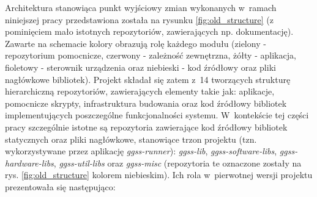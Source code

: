 Architektura stanowiąca punkt wyjściowy zmian wykonanych w~ramach niniejszej pracy przedstawiona została na rysunku \ref{fig:old_structure} (z pominięciem mało istotnych repozytoriów, zawierających np. dokumentację). Zawarte na schemacie kolory obrazują rolę każdego modułu (zielony - repozytorium pomocnicze, czerwony - zależność zewnętrzna, żółty - aplikacja, fioletowy - sterownik urządzenia oraz niebieski - kod źródłowy oraz pliki nagłówkowe bibliotek). Projekt składał się zatem z~14 tworzących strukturę hierarchiczną repozytoriów, zawierających elementy takie jak: aplikacje, pomocnicze skrypty, infrastruktura budowania oraz kod źródłowy bibliotek implementujących poszczególne funkcjonalności systemu. W~kontekście tej części pracy szczególnie istotne są repozytoria zawierające kod źródłowy bibliotek statycznych oraz pliki nagłówkowe, stanowiące trzon projektu (tzn. wykorzystywane przez aplikację \emph{ggss-runner}): \emph{ggss-lib}, \emph{ggss-software-libs}, \emph{ggss-hardware-libs}, \emph{ggss-util-libs} oraz \emph{ggss-misc} (repozytoria te oznaczone zostały na rys. \ref{fig:old_structure} kolorem niebieskim). Ich rola w~pierwotnej wersji projektu prezentowała się następująco:
